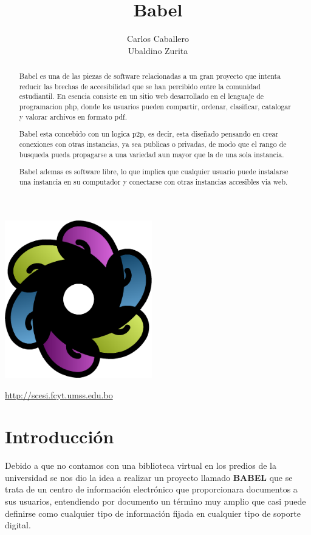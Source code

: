 \documentclass[letter,12pt]{article}
\title{\bf Babel}
\author{Carlos Caballero\\Ubaldino Zurita}
\begin{document}
\maketitle
\begin{center}\includegraphics[width=0.48\textwidth]{img/babel.png}\end{center}
\begin{center}\url {http://scesi.fcyt.umss.edu.bo}\end{center}
\pagebreak

\tableofcontents
\pagebreak

\begin{abstract}
Babel es una de las piezas de software relacionadas a un gran proyecto que
intenta reducir las brechas de accesibilidad que se han percibido entre la
comunidad estudiantil. En esencia consiste en un sitio web desarrollado en
el lenguaje de programacion php, donde los usuarios pueden compartir, ordenar,
clasificar, catalogar y valorar archivos en formato pdf.

Babel esta concebido con un logica p2p, es decir, esta diseñado pensando en
crear conexiones con otras instancias, ya sea publicas o privadas, de modo
que el rango de busqueda pueda propagarse a una variedad aun mayor que la de
una sola instancia.

Babel ademas es software libre, lo que implica que cualquier usuario puede
instalarse una instancia en su computador y conectarse con otras instancias
accesibles via web.
\end{abstract}
\pagebreak

\section{Introducción}
Debido a que no contamos con una biblioteca virtual en los predios de la universidad se nos dio la idea a realizar un proyecto llamado {\bf BABEL} que se trata de un centro de información electrónico que proporcionara documentos a sus usuarios, entendiendo por documento un término muy amplio que casi puede definirse como cualquier tipo de información fijada en cualquier tipo de soporte digital.
\end{document}
